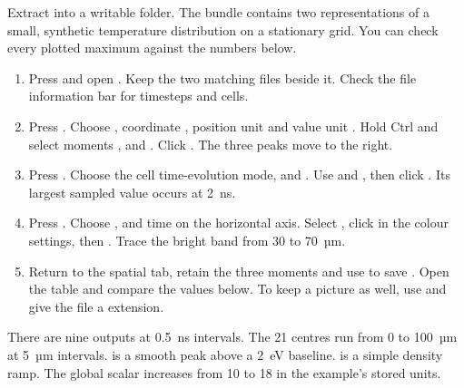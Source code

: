 Extract  into a writable folder. The bundle contains two representations of a small, synthetic temperature distribution on a stationary grid. You can check every plotted maximum against the numbers below.
\begin{enumerate}
\item Press  and open . Keep the two matching  files beside it. Check the file information bar for  timesteps and  cells.
\item Press . Choose , coordinate , position unit  and value unit . Hold Ctrl and select moments ,  and . Click . The three peaks move to the right.
\item Press . Choose the cell time-evolution mode,  and . Use  and , then click . Its largest sampled value occurs at 2~ns.
\item Press . Choose ,  and time on the horizontal axis. Select , click  in the colour settings, then . Trace the bright band from 30 to 70~µm.
\item Return to the spatial tab, retain the three moments and use  to save . Open the table and compare the values below. To keep a picture as well, use  and give the file a  extension.
\end{enumerate}
There are nine outputs at 0.5~ns intervals. The 21 centres run from 0 to 100~µm at 5~µm intervals.  is a smooth peak above a 2~eV baseline.  is a simple density ramp. The global scalar  increases from 10 to 18 in the example's stored units.

